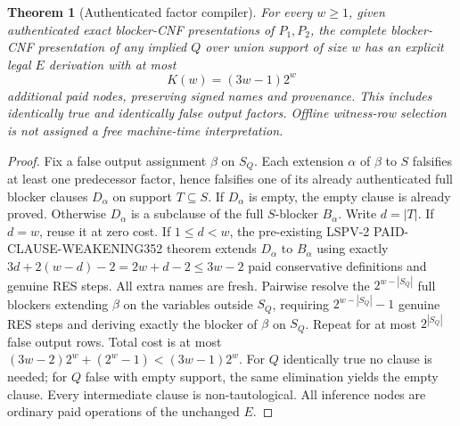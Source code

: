 \documentclass[11pt]{article}
\newtheorem{theorem}{Theorem}
\begin{document}
\begin{theorem}[Authenticated factor compiler]
For every $w\ge1$, given authenticated exact blocker-CNF presentations of $P_1,P_2$, the complete blocker-CNF presentation of any implied $Q$ over union support of size $w$ has an explicit legal $E$ derivation with at most
\[
\boxed{K(w)=(3w-1)2^w}
\]
additional paid nodes, preserving signed names and provenance. This includes identically true and identically false output factors. Offline witness-row selection is not assigned a free machine-time interpretation.
\end{theorem}
\begin{proof}
Fix a false output assignment $\beta$ on $S_Q$. Each extension $\alpha$ of $\beta$ to $S$ falsifies at least one predecessor factor, hence falsifies one of its already authenticated full blocker clauses $D_\alpha$ on support $T\subseteq S$. If $D_\alpha$ is empty, the empty clause is already proved. Otherwise $D_\alpha$ is a subclause of the full $S$-blocker $B_\alpha$. Write $d=|T|$. If $d=w$, reuse it at zero cost. If $1\le d<w$, the pre-existing LSPV-2 PAID-CLAUSE-WEAKENING352 theorem extends $D_\alpha$ to $B_\alpha$ using exactly $3d+2(w-d)-2=2w+d-2\le3w-2$ paid conservative definitions and genuine RES steps. All extra names are fresh.
Pairwise resolve the $2^{w-|S_Q|}$ full blockers extending $\beta$ on the variables outside $S_Q$, requiring $2^{w-|S_Q|}-1$ genuine RES steps and deriving exactly the blocker of $\beta$ on $S_Q$. Repeat for at most $2^{|S_Q|}$ false output rows. Total cost is at most $(3w-2)2^w+(2^w-1)<(3w-1)2^w$. For $Q$ identically true no clause is needed; for $Q$ false with empty support, the same elimination yields the empty clause. Every intermediate clause is non-tautological. All inference nodes are ordinary paid operations of the unchanged $E$.
\end{proof}
\end{document}
